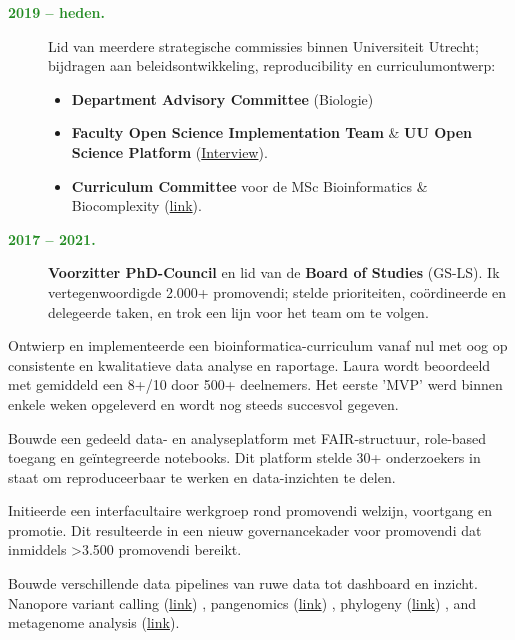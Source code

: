 \documentclass[a4paper,10pt]{article}
\begin{document}
{\begin{adjustbox}{valign=t}
\begin{minipage}[t]{0.6\textwidth}
\begin{description}
  \item[\normalfont \textcolor{ForestGreen}{\textbf{2019 -- heden.}}] 
    Lid van meerdere strategische commissies binnen Universiteit Utrecht;
    bijdragen aan beleidsontwikkeling, reproducibility en curriculumontwerp:
    \begin{itemize}
      \item \textbf{Department Advisory Committee} (Biologie)
      \item \textbf{Faculty Open Science Implementation Team} \& \textbf{UU Open Science Platform} 
      (\href{https://www.uu.nl/en/news/meet-laura-dijkhuizen}{Interview}).
      \item \textbf{Curriculum Committee} voor de MSc Bioinformatics \& Biocomplexity 
        (\href{https://www.uu.nl/en/masters/bioinformatics-and-biocomplexity}{link}).
    \end{itemize}
  \item[\normalfont \textcolor{ForestGreen}{\textbf{2017 -- 2021.}}] \textbf{Voorzitter PhD-Council} en lid van de \textbf{Board of Studies} (GS-LS).
    Ik vertegenwoordigde 2.000+ promovendi; stelde prioriteiten, coördineerde en delegeerde taken, en trok een lijn voor het team om te volgen.
\end{description}


\begin{description}
  \item Ontwierp en implementeerde een bioinformatica-curriculum vanaf nul met oog op consistente en kwalitatieve data analyse en raportage.
    Laura wordt beoordeeld met gemiddeld een 8+/10 door 500+ deelnemers.
    Het eerste 'MVP' werd binnen enkele weken opgeleverd en wordt nog steeds succesvol gegeven.
  \item Bouwde een gedeeld data- en analyseplatform met FAIR-structuur, role-based toegang en geïntegreerde notebooks.
    Dit platform stelde 30+ onderzoekers in staat om reproduceerbaar te werken en data-inzichten te delen.
  \item Initieerde een interfacultaire werkgroep rond promovendi welzijn, voortgang en promotie.
    Dit resulteerde in een nieuw governancekader voor promovendi dat inmiddels >3.500 promovendi bereikt.
  \item Bouwde verschillende data pipelines van ruwe data tot dashboard en inzicht.
    Nanopore variant calling (\href{https://github.com/lauralwd/anabaena_nanopore_workflow}{link})  
    , pangenomics (\href{https://github.com/lauralwd/Nostoc_azollae_pangenomics}{link})
    , phylogeny (\href{https://github.com/lauralwd/lauras_phylogeny_wf}{link})
    , and metagenome analysis (\href{https://github.com/lauralwd/Azolla_genus_meta_pangenome}{link}). 
\end{description}

\end{minipage}%
\end{adjustbox}%
}
\end{document}
